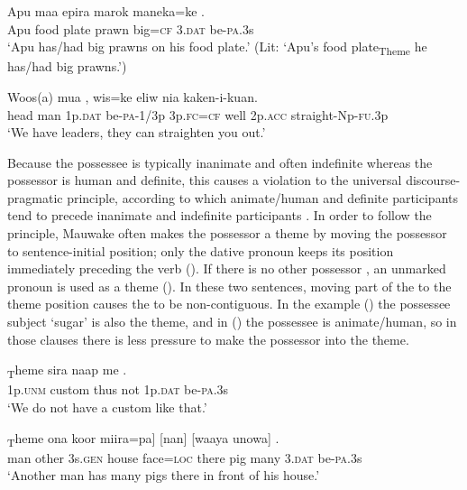 \ea%
\label{ex:x1065}
\gll Apu  maa  epira  marok  maneka=ke   . \\
     Apu  food  plate  prawn  big=\textsc{cf}  3.\textsc{dat}  be-\textsc{pa}.3s \\
\glt `Apu has/had big prawns on his food plate.' (Lit: `Apu's food plate\textsubscript{Theme} he has/had big prawns.')
\z

\ea%
\label{ex:x1323}
\gll Woos(a)  mua   ,  wis=ke  eliw  nia kaken-i-kuan. \\
     head  man  1p.\textsc{dat}  be-\textsc{pa}-1/3p  3p.\textsc{fc}=\textsc{cf}  well  2p.\textsc{acc} straight-Np-\textsc{fu}.3p \\
\glt `We have leaders, they can straighten you out.'
\z

Because the possessee is typically inanimate and often indefinite whereas the possessor is human and definite, this causes a violation to the universal discourse-pragmatic principle, according to which animate/human and definite participants tend to precede inanimate and indefinite participants \citep[135]{Heine1997}. In order to follow the principle, Mauwake often makes the possessor a theme by moving the possessor  to sentence-initial position; only the dative pronoun keeps its position immediately preceding the verb (). If there is no other possessor , an unmarked pronoun is used as a theme (). In these two sentences, moving part of the  to the theme position causes the  to be non-contiguous. In the example () the possessee subject  `sugar' is also the theme, and in () the possessee is animate/human, so in those clauses there is less pressure to make the possessor into the theme.

\ea%
\label{ex:x973}
\gll [\textstyleEmphasizedVernacularWords{I}]\textsubscript{T}heme  sira  naap  me   . \\
     1p.\textsc{unm}  custom  thus  not  1p.\textsc{dat}  be-\textsc{pa}.3s \\
\glt `We do not have a custom like that.'
\z

\ea%
\label{ex:x972}
\textsubscript{T}heme  ona  koor  miira=pa]  [nan]  [waaya unowa]   . \\
     man  other  3s.\textsc{gen}  house  face=\textsc{loc}  there  pig many  3.\textsc{dat}  be-\textsc{pa}.3s \\
\glt `Another man has many pigs there in front of his house.'
\z

